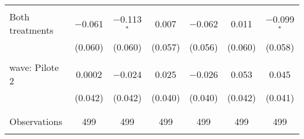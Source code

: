 \begin{tabular}{@{\extracolsep{5pt}}lcccccc}
  & & & & & & \\ 
 Both treatments & $-$0.061 & $-$0.113$^{*}$ & 0.007 & $-$0.062 & 0.011 & $-$0.099$^{*}$ \\ 
  & (0.060) & (0.060) & (0.057) & (0.056) & (0.060) & (0.058) \\ 
  & & & & & & \\ 
 wave: Pilote 2 & 0.0002 & $-$0.024 & 0.025 & $-$0.026 & 0.053 & 0.045 \\ 
  & (0.042) & (0.042) & (0.040) & (0.040) & (0.042) & (0.041) \\ 
  & & & & & & \\ 
\hline \\[-1.8ex] 

Observations & 499 & 499 & 499 & 499 & 499 & 499 \\ 
\hline 
\hline \\[-1.8ex] 
\end{tabular} 